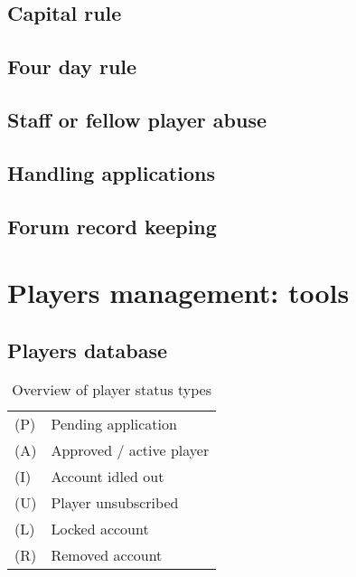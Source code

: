 \documentclass[a4paper,12pt]{article}
\begin{document}
\subsection{Capital rule}

\subsection{Four day rule}

\subsection{Staff or fellow player abuse}

\subsection{Handling applications}


\subsection{Forum record keeping}

\section{Players management: tools}

\subsection{Players database}

\begin{table}[!ht]
\colorbox{gray!20}{
\begin{minipage}{.6\textwidth}
\begin{center}
\begin{tabular}{ll}
(P) & Pending application \\
(A) & Approved / active player \\
(I) & Account idled out \\
(U) & Player unsubscribed \\
(L) & Locked account \\
(R) & Removed account \\
\end{tabular}
\caption{Overview of player status types}
\label{tab:status}
\end{center}
\end{minipage}}
\end{table}
\end{document}
